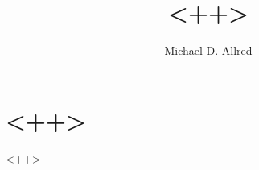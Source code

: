 \documentclass[10pt,letterpaper]{article}
\title{<++>}
\author{Michael D. Allred}
\begin{document}
\maketitle

\section{<++>}

<++>
\end{document}

